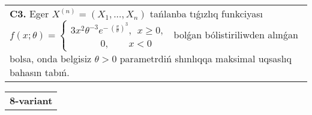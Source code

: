 \documentclass{article}
\begin{document}
\begin{tabular}{m{17cm}}
 \\
\textbf{C3.} 
Eger \(X^{(n)} = \left( X_{1},...,X_{n} \right)\) tańlanba tıǵızlıq funkciyası
$f(x;\theta) = \left\{ \begin{matrix}
3x^{2}\theta^{- 3}e^{- \ \left( \frac{x}{\theta} \right)^{3}},\ \ x \geq 0, \\
\ \ \ \ \ \ \ \ \ \ \ \ \ \ 0,\ \ \ \ \ \ \ \ \ x < 0
\end{matrix} \right.\ $
bolǵan bólistiriliwden alınǵan bolsa, onda belgisiz \(\theta > 0\) parametrdiń shınlıqqa maksimal uqsaslıq bahasın tabıń.
 \\

\end{tabular}
\vspace{1cm}


\begin{tabular}{m{17cm}}
\textbf{8-variant}
\newline


\end{tabular}
\end{document}
